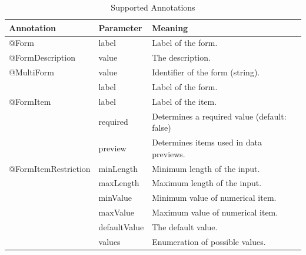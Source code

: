 \documentclass[a4paper,twoside]{article}
\begin{document}
\begin{table}
\begin{tabular}{|l|l|l|}
\hline
{\bf Annotation} & {\bf Parameter} & {\bf Meaning} \\
\hline
     @Form &      label & Label of the form. \\
\hline
@FormDescription &      value & The description. \\
\hline
\multicolumn{ 1}{|l|}{@MultiForm} &      value & Identifier of the form (string). \\

\multicolumn{ 1}{|l|}{} &      label & Label of the form. \\
\hline
\multicolumn{ 1}{|l|}{@FormItem} &      label & Label of the item. \\

\multicolumn{ 1}{|l|}{} &   required & Determines a required value (default: false) \\

\multicolumn{ 1}{|l|}{} &    preview & Determines items used in data previews. \\
\hline
\multicolumn{ 1}{|l|}{@FormItemRestriction} &  minLength & Minimum length of the input. \\

\multicolumn{ 1}{|l|}{} &  maxLength & Maximum length of the input. \\

\multicolumn{ 1}{|l|}{} &   minValue & Minimum value of numerical item. \\

\multicolumn{ 1}{|l|}{} &   maxValue & Maximum value of numerical item. \\

\multicolumn{ 1}{|l|}{} & defaultValue & The default value. \\

\multicolumn{ 1}{|l|}{} &     values & Enumeration of possible values. \\
\hline
\end{tabular}
\caption{\label{annotations}Supported Annotations}
\end{table}
\end{document}
